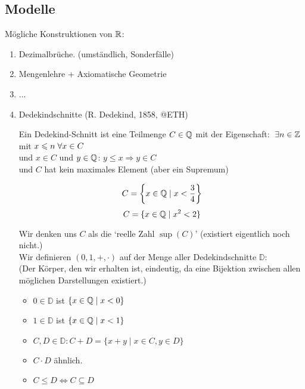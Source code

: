 \documentclass[main.tex]{subfiles}
\begin{document}
\subsection{Modelle}

Mögliche Konstruktionen von $\mathbb{R}$:
\begin{enumerate}
  \item Dezimalbrüche. (umständlich, Sonderfälle)
  \item Mengenlehre + Axiomatische Geometrie
  \item ...
  \item Dedekindschnitte (R. Dedekind, 1858, @ETH)
  \begin{Definition}
    Ein Dedekind-Schnitt ist eine Teilmenge $C \in \mathbb{Q}$ mit der Eigenschaft:
    $\;\exists n \in \mathbb{Z}$ mit $x \leqslant n \;\forall x \in C$\\
    und $x\in C$ und $y \in \mathbb{Q}$: $y \leq x \Rightarrow y \in C$\\
    und $C$ hat kein maximales Element (aber ein Supremum)
  \end{Definition}
  \begin{Beispiel}
    $$C = \left\{x \in \mathbb{Q} \mid x < \dfrac{3}{4}\right\}$$
    $$C = \{x \in \mathbb{Q} \mid x^2 < 2 \}$$
  \end{Beispiel}
   Wir denken uns $C$ als die `reelle Zahl $\sup(C)$' (existiert eigentlich noch nicht.)\\
   Wir definieren $(0,1,+,\cdot)$ auf der Menge aller Dedekindschnitte $\mathbb{D}$:\\
   (Der Körper, den wir erhalten ist, eindeutig, da eine Bijektion zwischen allen möglichen Darstellungen existiert.)
   \begin{itemize}
     \item $0 \in \mathbb{D}$ ist $\{x \in \mathbb{Q} \mid x < 0 \}$
     \item $1 \in \mathbb{D}$ ist $\{x \in \mathbb{Q} \mid x < 1 \}$
     \item $C,D \in \mathbb{D}: C+D = \{x+y \mid x \in C, y \in D \}$
     \item $C \cdot D$ ähnlich.
     \item $C \leq D \Leftrightarrow C \subseteq D$
   \end{itemize}
\end{enumerate}
\end{document}
